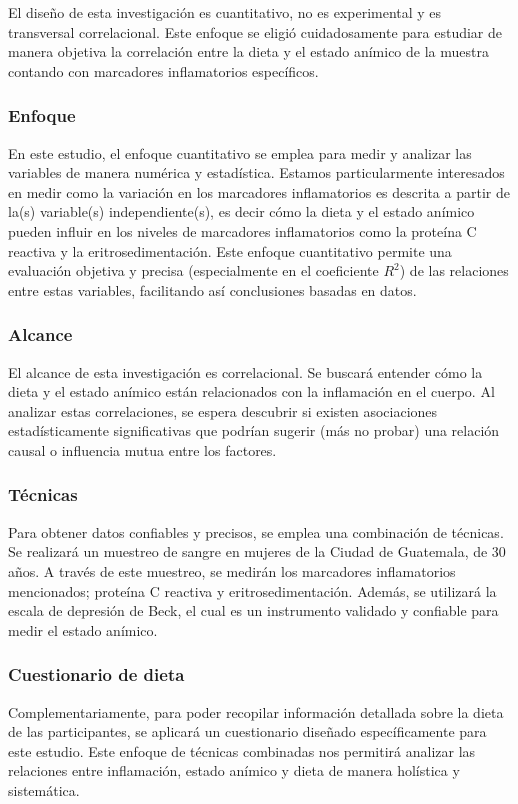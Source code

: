 \documentclass[jou]{apa7}
\begin{document}
	El diseño de esta investigación es cuantitativo, no es experimental y es
	transversal correlacional. Este enfoque se eligió cuidadosamente para
	estudiar de manera objetiva la correlación entre la dieta y el estado
	anímico de la muestra contando con marcadores inflamatorios
	específicos.\\
	
	\subsubsection{Enfoque} En este estudio, el enfoque cuantitativo se emplea para
	medir y analizar las variables de manera numérica y estadística. Estamos
	particularmente interesados en medir como la variación en los marcadores
	inflamatorios es descrita a partir de la(s) variable(s)
	independiente(s), es decir cómo la dieta y el estado anímico pueden
	influir en los niveles de marcadores inflamatorios como la proteína C
	reactiva y la eritrosedimentación. Este enfoque cuantitativo permite una
	evaluación objetiva y precisa (especialmente en el coeficiente
	\emph{$R^2$}) de las relaciones entre estas variables, facilitando así
	conclusiones basadas en datos.\\
	
	\subsubsection{Alcance} El alcance de esta investigación es correlacional. Se
	buscará entender cómo la dieta y el estado anímico están relacionados
	con la inflamación en el cuerpo. Al analizar estas correlaciones, se
	espera descubrir si existen asociaciones estadísticamente significativas
	que podrían sugerir (más no probar) una relación causal o influencia
	mutua entre los factores.
	
	\subsubsection{Técnicas}
	Para obtener datos confiables y precisos, se emplea una combinación de técnicas. Se realizará un muestreo de sangre en mujeres de la Ciudad de Guatemala, de 30 años. A través de este muestreo, se medirán los marcadores inflamatorios mencionados; proteína C reactiva y eritrosedimentación. Además, se utilizará la escala de depresión de Beck, el cual es un instrumento validado y confiable para medir el estado anímico.
	
	\subsubsection{Cuestionario de dieta}
	Complementariamente, para poder recopilar información detallada sobre la dieta de las participantes, se aplicará un cuestionario diseñado específicamente para este estudio. Este enfoque de técnicas combinadas nos permitirá analizar las relaciones entre inflamación, estado anímico y dieta de manera holística y sistemática.
	
\end{document}
